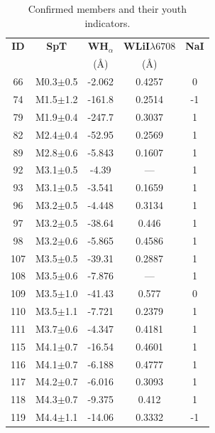 \documentclass[12pt]{article}
\begin{document}
\begin{table} \scriptsize
 \caption[Youth indicators of the confirmed members from the BOSS spectra]{Confirmed members and their youth indicators.}
 \label{tab_BOSS:membership}
 \begin{threeparttable}
  \setlength{\tabcolsep}{10pt}
  \renewcommand{\arraystretch}{1.034}
	\begin{minipage}{0.48\textwidth}
	  \begin{tabular}{ccccc}
		\toprule
		{\bf ID} & {\bf SpT} & {\bf WH$_\alpha$} & {\bf WLiI$\lambda6708$} & {\bf NaI} \\
		   &     & (\AA)       & (\AA)             &     \\
		\midrule
		66  & M0.3$\pm$0.5  & -2.062  & 0.4257  & 0   \\ 
	  	74  & M1.5$\pm$1.2  & -161.8  & 0.2514  & -1  \\ 
	  	79  & M1.9$\pm$0.4  & -247.7  & 0.3037  & 1   \\ 
	  	82  & M2.4$\pm$0.4  & -52.95  & 0.2569  & 1   \\ 
	  	89  & M2.8$\pm$0.6  & -5.843  & 0.1607  & 1   \\ 
	  	92  & M3.1$\pm$0.5  & -4.39   & ---     & 1   \\ 
	  	93  & M3.1$\pm$0.5  & -3.541  & 0.1659  & 1   \\ 
	  	96  & M3.2$\pm$0.5  & -4.448  & 0.3134  & 1   \\ 
	  	97  & M3.2$\pm$0.5  & -38.64  & 0.446   & 1   \\ 
	  	98  & M3.2$\pm$0.6  & -5.865  & 0.4586  & 1   \\ 
	  	107 & M3.5$\pm$0.5  & -39.31  & 0.2887  & 1   \\ 
	  	108 & M3.5$\pm$0.6  & -7.876  & ---     & 1   \\ 
	  	109 & M3.5$\pm$1.0  & -41.43  & 0.577   & 0   \\ 
	  	110 & M3.5$\pm$1.1  & -7.721  & 0.2379  & 1   \\ 
	  	111 & M3.7$\pm$0.6  & -4.347  & 0.4181  & 1   \\ 
	  	115 & M4.1$\pm$0.7  & -16.54  & 0.4601  & 1   \\ 
	  	116 & M4.1$\pm$0.7  & -6.188  & 0.4777  & 1   \\ 
	  	117 & M4.2$\pm$0.7  & -6.016  & 0.3093  & 1   \\ 
	  	118 & M4.3$\pm$0.7  & -9.375  & 0.412   & 1   \\ 
	  	119 & M4.4$\pm$1.1  & -14.06  & 0.3332  & -1  \\ 

\end{tabular}
\end{minipage}
\end{threeparttable}
\end{table}
\end{document}
